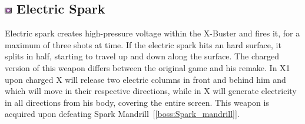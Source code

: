 \subsection{\includegraphics[width=12px, height=10px]{figures/X1/weapons/E_Spark.jpg} Electric Spark}\label{Electric_spark}
Electric spark creates high-pressure voltage within the X-Buster and fires it, for a maximum of three shots at time. If the electric spark hits an hard surface, it splits in half, starting to travel up and down along the surface. The charged version of this weapon differs between the original game and his remake. In X1 upon charged X will release two electric columns in front and behind him and which will move in their respective directions, while in \mhx X will generate electricity in all directions from his body, covering the entire screen. This weapon is acquired upon defeating Spark Mandrill~[\ref{boss:Spark_mandrill}].
